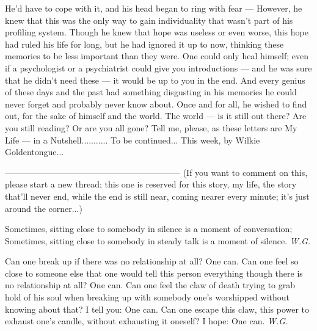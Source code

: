 He'd have to cope with it, and his head began to ring with fear --- However, he knew that this was the only way to gain individuality that wasn't part of his profiling system. 
Though he knew that hope was useless or even worse, this hope had ruled his life for long, but he had ignored it up to now, thinking these memories to be less important than they were. 
One could only heal himself; even if a psychologist or a psychiatrist could give you introductions --- and he was sure that he didn't need these --- it would be up to you in the end. 
And every genius of these days and the past had something disgusting in his memories he could never forget and probably never know about. 
Once and for all, he wished to find out, for the sake of himself and the world. 
The world --- is it still out there?
Are you still reading?
Or are you all gone?
Tell me, please, as these letters are My Life --- in a Nutshell...........
To be continued...
This week, by Wilkie Goldentongue...

--------------------------------------------------------------
(If you want to comment on this, please start a new thread; this one is reserved for this story, my life, the story that'll never end, while the end is still near, coming nearer every minute; it's just around the corner...)

Sometimes, 
sitting close to somebody in silence 
is a moment of conversation; 
Sometimes, 
sitting close to somebody in steady talk
is a moment of silence. 
\emph{W.G.}

Can one break up 
if there was no relationship at all? 
One can. 
Can one feel so close to someone else 
that one would tell this person everything 
though there is no relationship at all? 
One can. 
Can one feel the claw of death trying to grab hold of his soul 
when breaking up 
with somebody 
one's worshipped without knowing about that? 
I tell you: One can. 
Can one escape this claw, 
this power to exhaust one's candle, 
without exhausting it oneself? 
I hope: One can. 
\emph{W.G.}
